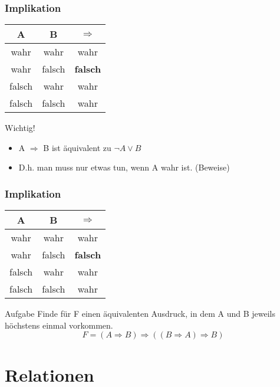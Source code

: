 \documentclass{beamer}
\begin{document}
\begin{frame}
	\frametitle {Implikation}
	\begin{center}
		\begin{tabular}{|c|c||c| }
			\hline
			A & B & $\Rightarrow$ \\
			\hline
			wahr & wahr & wahr \\
			\hline
			wahr & falsch & \textbf{falsch}	\\
			\hline
			falsch & wahr & wahr \\
			\hline
			falsch & falsch & wahr \\
			\hline
		\end{tabular}
	\end{center}
	\begin{alertblock}{Wichtig!}
		\begin{itemize}
			\item A $\Rightarrow$ B ist äquivalent zu \(\neg A\vee B\)
			\item D.h. man muss nur etwas tun, wenn A wahr ist. (Beweise)
		\end{itemize}
	\end{alertblock}
\end{frame}

\begin{frame}
	\frametitle {Implikation}
	\begin{center}
		\begin{tabular}{|c|c||c| }
			\hline
			A & B & $\Rightarrow$ \\
			\hline
			wahr & wahr & wahr \\
			\hline
			wahr & falsch & \textbf{falsch}	\\
			\hline
			falsch & wahr & wahr \\
			\hline
			falsch & falsch & wahr \\
			\hline
		\end{tabular}
	\end{center}
	\begin{exampleblock}{Aufgabe}
		Finde für F einen äquivalenten Ausdruck, in dem A und B jeweils höchstens 			einmal vorkommen.
		\begin{displaymath}
			F = (A\Rightarrow B) \Rightarrow ((B\Rightarrow A) \Rightarrow B)
		\end{displaymath}
	\end{exampleblock}
\end{frame}

\section{Relationen}
\end{document}
